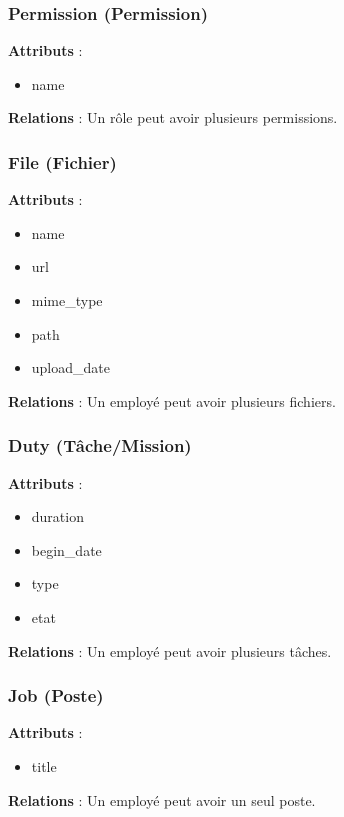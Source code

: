 \subsubsection{Permission (Permission)}
\textbf{Attributs} :
\begin{itemize}
    \item name
\end{itemize}
\textbf{Relations} : Un rôle peut avoir plusieurs permissions.

\subsubsection{File (Fichier)}
\textbf{Attributs} :
\begin{itemize}
    \item name
    \item url
    \item mime\_type
    \item path
    \item upload\_date
\end{itemize}
\textbf{Relations} : Un employé peut avoir plusieurs fichiers.

\subsubsection{Duty (Tâche/Mission)}
\textbf{Attributs} :
\begin{itemize}
    \item duration
    \item begin\_date
    \item type
    \item etat
\end{itemize}
\textbf{Relations} : Un employé peut avoir plusieurs tâches.

\subsubsection{Job (Poste)}
\textbf{Attributs} :
\begin{itemize}
    \item title
\end{itemize}
\textbf{Relations} : Un employé peut avoir un seul poste.


